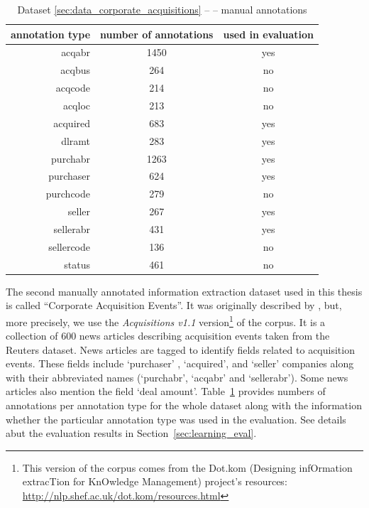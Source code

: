 \begin{table}
\centering
\begin{tabular}{|r||c|c|}
\hline
\textbf{annotation type} & \textbf{number of annotations} & \textbf{used in evaluation}\\
\hline
\hline
acqabr & 1450 & yes\\
\hline
acqbus & 264 & no\\
\hline
acqcode & 214 & no\\
\hline
acqloc & 213 & no\\
\hline
acquired & 683 & yes\\
\hline
dlramt & 283 & yes\\
\hline
purchabr & 1263 & yes\\
\hline
purchaser & 624 & yes\\
\hline
purchcode & 279 & no\\
\hline
seller & 267 & yes\\
\hline
sellerabr & 431 & yes\\
\hline
sellercode & 136 & no\\
\hline
status & 461 & no\\
\hline
\end{tabular}
\caption{Dataset \ref{sec:data_corporate_acquisitions} --  -- manual annotations} \label{tab:data_acquisitions}
\end{table}


The second manually annotated information extraction dataset used in this thesis is called ``Corporate Acquisition Events''. It was originally described by \cite{lewis1992representation}, but, more precisely, we use the \emph{Acquisitions v1.1} version\footnote{This version of the corpus comes from the Dot.kom (Designing infOrmation extracTion for KnOwledge Management) project's resources: \url{http://nlp.shef.ac.uk/dot.kom/resources.html}} of the corpus.
It is a collection of 600 news articles describing acquisition
events taken from the Reuters dataset. News articles are tagged to identify fields
related to acquisition events. These fields include `purchaser' , `acquired', and
`seller' companies along with their abbreviated names (`purchabr', `acqabr' and
`sellerabr'). Some news articles also mention the field `deal amount'. 
Table~\ref{tab:data_acquisitions} provides numbers of annotations per annotation type for the whole dataset along with the information whether the particular annotation type was used in the evaluation. See details abut the evaluation results in Section~\ref{sec:learning_eval}. 


